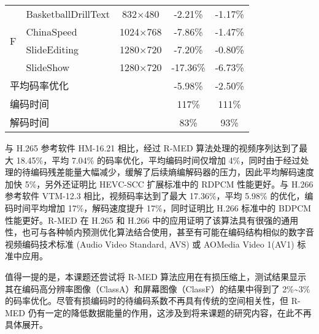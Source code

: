 \begin{table}[!p]
\begin{tabular}{@{}clccc@{}}
        \multirow{4}{*}{F}               & BasketballDrillText                       & 832$\times$480          & -2.21\%                            & -1.17\%                    \\
                                         & ChinaSpeed                                & 1024$\times$768         & -7.86\%                            & -1.47\%                    \\
                                         & SlideEditing                              & 1280$\times$720         & -7.20\%                            & -0.80\%                    \\
                                         & SlideShow                                 & 1280$\times$720         & -17.36\%                           & -6.73\%                    \\ \midrule
        \multicolumn{2}{l}{平均码率优化} &                                           & -5.98\%                 & -2.50\%                                                         \\ \midrule
        \multicolumn{2}{l}{编码时间}     &                                           & 117\%                   & 111\%                                                           \\ \midrule
        \multicolumn{2}{l}{解码时间}     &                                           & 83\%                    & 93\%                                                            \\ \bottomrule
    \end{tabular}
\end{table}

与 H.265 参考软件 HM-16.21 相比，经过 R-MED 算法处理的视频序列达到了最大 18.45\%，平均 7.04\% 的码率优化，平均编码时间仅增加 4\%，同时由于经过处理的待编码残差能量大幅减少，缓解了后续熵编解码器的压力，因此平均解码速度加快 5\%，另外还证明比 HEVC-SCC 扩展标准中的 RDPCM 性能更好。与 H.266 参考软件 VTM-12.3 相比，视频码率达到了最大 17.36\%，平均 5.98\% 的优化，编码时间平均增加 17\%，解码速度提升 17\%，同时证明比 H.266 标准中的 BDPCM 性能更好。R-MED 在 H.265 和 H.266 中的应用证明了该算法具有很强的通用性，也可与各种帧内预测优化算法结合使用，甚至有可能在编码结构相似的数字音视频编码技术标准 (Audio Video Standard, AVS) 或 AOMedia Video 1(AV1) 标准中应用。

值得一提的是，本课题还尝试将 R-MED 算法应用在有损压缩上，测试结果显示其在编码高分辨率图像（ClassA）和屏幕图像（ClassF）的结果中得到了 2\%\textasciitilde 3\% 的码率优化。尽管有损编码时的待编码系数不再具有传统的空间相关性，但 R-MED 仍有一定的降低数据能量的作用，这涉及到将来课题的研究内容，在此不再具体展开。

